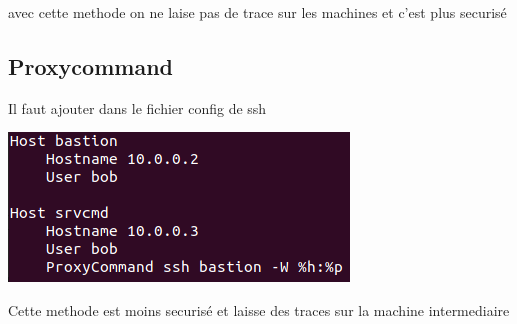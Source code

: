 \documentclass{article}
\begin{document}
 avec cette methode on ne laise pas de trace sur les machines et c'est plus securisé
 
 
  
  \subsection{\large{Proxycommand}}
  
  Il faut ajouter dans le fichier config de ssh
  
  \begin{center}
        \includegraphics[scale=0.5]{Images/proxycommand.png}
 \end{center}
 
 Cette methode est moins securisé et laisse des traces sur la machine intermediaire 
  
 
 
 
\end{document}
